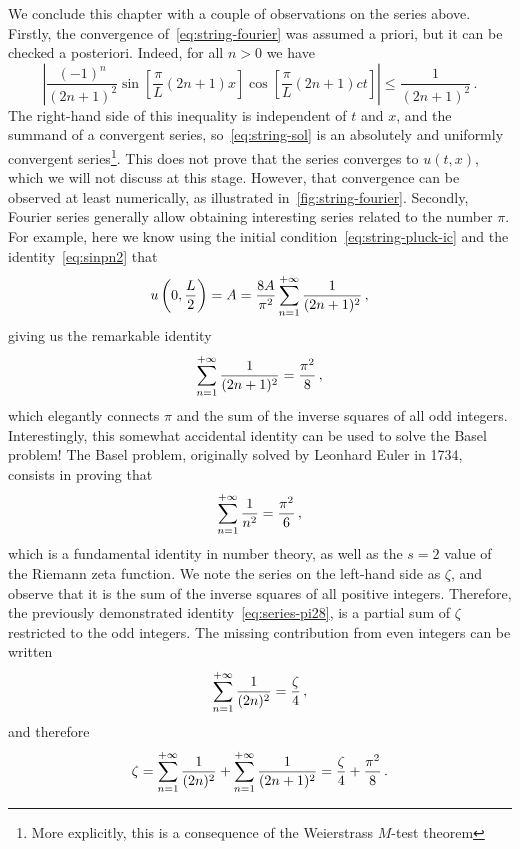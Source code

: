 We conclude this chapter with a couple of observations on the series above. Firstly, the
convergence of~\cref{eq:string-fourier} was assumed a priori, but it can be checked a
posteriori. Indeed, for all $n>0$ we have
\begin{equation}
	\left|\frac{(-1)^n}{(2n+1)^2}\sin\left[\frac{\pi}{L}(2n+1)x\right]
	\cos\left[\frac{\pi}{L}(2n+1)ct\right]\right|
	\leq\frac{1}{(2n+1)^2}\,.
\end{equation}
The right-hand side of this inequality is independent of $t$ and $x$, and the summand of a
convergent series, so~\cref{eq:string-sol} is an absolutely and uniformly convergent
series\footnote{More explicitly, this is a consequence of the Weierstrass $M$-test
	theorem}. This does not prove that the series converges to $u(t,x)$, which we will not
discuss at this stage. However, that convergence can be observed at least numerically, as
illustrated in~\cref{fig:string-fourier}. Secondly, Fourier series generally allow
obtaining interesting series related to the number $\pi$. For example, here we know using
the initial condition~\cref{eq:string-pluck-ic} and the identity~\cref{eq:sinpn2} that
\begin{equation}
	u\left(0,\frac{L}{2}\right)=A=\frac{8A}{\pi^2}\sum_{n=1}^{+\infty}\frac{1}{(2n+1)^2}\,,
\end{equation}
giving us the remarkable identity
\begin{equation}
	\sum_{n=1}^{+\infty}\frac{1}{(2n+1)^2}=\frac{\pi^2}{8}\,,
	\label{eq:series-pi28}
\end{equation}
which elegantly connects $\pi$ and the sum of the inverse squares of all odd integers.
Interestingly, this somewhat accidental identity can be used to solve the Basel problem!
The Basel problem, originally solved by Leonhard Euler in 1734, consists in proving that
\begin{equation}
	\sum_{n=1}^{+\infty}\frac{1}{n^2}=\frac{\pi^2}{6}\,,
\end{equation}
which is a fundamental identity in number theory, as well as the $s=2$ value of the
Riemann zeta function. We note the series on the left-hand side as $\zeta$, and observe
that it is the sum of the inverse squares of all positive integers. Therefore, the
previously demonstrated identity~\cref{eq:series-pi28}, is a partial sum of $\zeta$
restricted to the odd integers. The missing contribution from even integers can be written
\begin{equation}
	\sum_{n=1}^{+\infty}\frac{1}{(2n)^2}=\frac{\zeta}{4}\,,
\end{equation}
and therefore
\begin{equation}
	\zeta=\sum_{n=1}^{+\infty}\frac{1}{(2n)^2}+\sum_{n=1}^{+\infty}\frac{1}{(2n+1)^2}
	=\frac{\zeta}{4}+\frac{\pi^2}{8}\,.
\end{equation}
